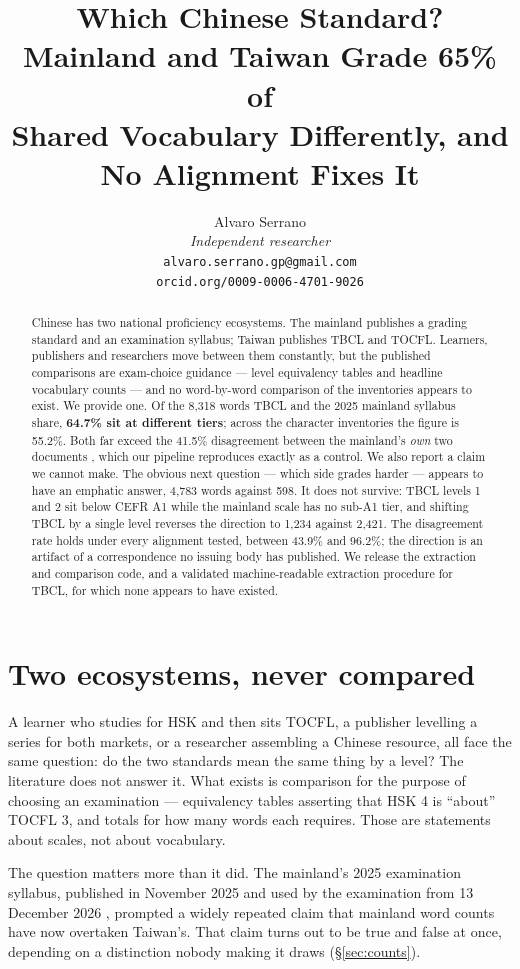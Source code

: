 \documentclass[11pt]{article}
\title{Which Chinese Standard? Mainland and Taiwan Grade 65\% of\\
       Shared Vocabulary Differently, and No Alignment Fixes It}
\author{Alvaro Serrano \\
  \textit{Independent researcher} \\
  \texttt{alvaro.serrano.gp@gmail.com} \\
  \texttt{orcid.org/0009-0006-4701-9026}}
\begin{document}
\maketitle

\begin{abstract}
Chinese has two national proficiency ecosystems. The mainland publishes a
grading standard and an examination syllabus; Taiwan publishes TBCL and TOCFL.
Learners, publishers and researchers move between them constantly, but the
published comparisons are exam-choice guidance --- level equivalency tables and
headline vocabulary counts --- and no word-by-word comparison of the
inventories appears to exist. We provide one. Of the 8{,}318 words TBCL and the
2025 mainland syllabus share, \textbf{64.7\% sit at different tiers}; across the
character inventories the figure is 55.2\%. Both far exceed the 41.5\%
disagreement between the mainland's \emph{own} two documents
\citep{serrano2026whichhsk}, which our pipeline reproduces exactly as a control.
We also report a claim we cannot make. The obvious next question --- which side
grades harder --- appears to have an emphatic answer, 4{,}783 words against 598.
It does not survive: TBCL levels 1 and 2 sit below CEFR A1 while the mainland
scale has no sub-A1 tier, and shifting TBCL by a single level reverses the
direction to 1{,}234 against 2{,}421. The disagreement rate holds under every
alignment tested, between 43.9\% and 96.2\%; the direction is an artifact of a
correspondence no issuing body has published. We release the extraction and
comparison code, and a validated machine-readable extraction procedure for
TBCL, for which none appears to have existed.
\end{abstract}

\section{Two ecosystems, never compared}

A learner who studies for HSK and then sits TOCFL, a publisher levelling a
series for both markets, or a researcher assembling a Chinese resource, all face
the same question: do the two standards mean the same thing by a level? The
literature does not answer it. What exists is comparison for the purpose of
choosing an examination --- equivalency tables asserting that HSK 4 is
``about'' TOCFL 3, and totals for how many words each requires. Those are
statements about scales, not about vocabulary.

The question matters more than it did. The mainland's 2025 examination syllabus,
published in November 2025 and used by the examination from 13 December 2026
\citep{smec2026launch}, prompted a widely repeated claim that
mainland word counts have now overtaken Taiwan's. That claim turns out to be
true and false at once, depending on a distinction nobody making it draws
(\S\ref{sec:counts}).
\end{document}
